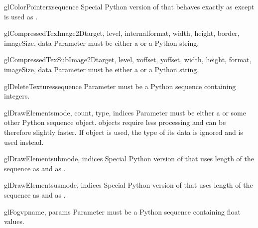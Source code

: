\begin{funcdesc}{glColorPointerx}{sequence}
Special Python version of  that behaves exactly as
 except  is used as .
\end{funcdesc}

\begin{funcdesc}{glCompressedTexImage2D}{target, level, internalformat, width, height, border, imageSize, data}
Parameter  must be either a  or a Python string.
\end{funcdesc}

\begin{funcdesc}{glCompressedTexSubImage2D}{target, level, xoffset, yoffset, width, height, format, imageSize, data}
Parameter  must be either a  or a Python string.
\end{funcdesc}

\begin{funcdesc}{glDeleteTextures}{sequence}
Parameter  must be a Python sequence containing integers.
\end{funcdesc}

\begin{funcdesc}{glDrawElements}{mode, count, type, indices}
Parameter  must be either a  or some other Python
sequence object.  objects require less processing and can be
therefore slightly faster. If  object is used, the type of its
data is ignored and  is used instead.
\end{funcdesc}

\begin{funcdesc}{glDrawElementsub}{mode, indices}
Special Python version of  that uses length of the sequence
 as  and  as .
\end{funcdesc}

\begin{funcdesc}{glDrawElementsus}{mode, indices}
Special Python version of  that uses length of the sequence
 as  and  as .
\end{funcdesc}

\begin{funcdesc}{glFogv}{pname, params}
Parameter  must be a Python sequence containing float values.
\end{funcdesc}

